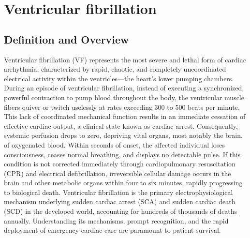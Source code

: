 \chapter{Ventricular fibrillation}

\section*{Definition and Overview}
Ventricular fibrillation (VF) represents the most severe and lethal form of cardiac arrhythmia, characterized by rapid, chaotic, and completely uncoordinated electrical activity within the ventricles---the heart's lower pumping chambers. During an episode of ventricular fibrillation, instead of executing a synchronized, powerful contraction to pump blood throughout the body, the ventricular muscle fibers quiver or twitch uselessly at rates exceeding 300 to 500 beats per minute. This lack of coordinated mechanical function results in an immediate cessation of effective cardiac output, a clinical state known as cardiac arrest. Consequently, systemic perfusion drops to zero, depriving vital organs, most notably the brain, of oxygenated blood. Within seconds of onset, the affected individual loses consciousness, ceases normal breathing, and displays no detectable pulse. If this condition is not corrected immediately through cardiopulmonary resuscitation (CPR) and electrical defibrillation, irreversible cellular damage occurs in the brain and other metabolic organs within four to six minutes, rapidly progressing to biological death. Ventricular fibrillation is the primary electrophysiological mechanism underlying sudden cardiac arrest (SCA) and sudden cardiac death (SCD) in the developed world, accounting for hundreds of thousands of deaths annually. Understanding its mechanisms, prompt recognition, and the rapid deployment of emergency cardiac care are paramount to patient survival.

